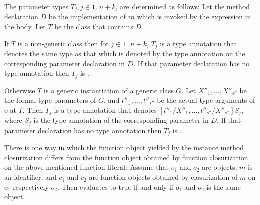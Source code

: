 \documentclass{article}
\begin{document}



\LMHash{}
The parameter types $T_j, j \in 1 .. n+k$, are determined as follows:
Let the method declaration $D$ be the implementation of $m$ which is invoked by the expression in the body.
Let $T$ be the class that contains $D$.


\LMHash{}
If $T$ is a non-generic class then for $j \in 1 .. n+k$,
$T_j$ is a type annotation that denotes the same type as that which is denoted by the type annotation on the corresponding parameter declaration in $D$.
If that parameter declaration has no type annotation then $T_j$ is \DYNAMIC{}.

\LMHash{}
Otherwise $T$ is a generic instantiation of a generic class $G$.
Let $X''_1, \ldots, X''_{s''}$ be the formal type parameters of $G$,
and $t''_1, \ldots, t''_{s''}$ be the actual type arguments of $o$ at $T$.
Then $T_j$ is a type annotation that denotes $[t''_1/X''_1, \ldots, t''_{s''}/X''_{s''}]S_j$,
where $S_j$ is the type annotation of the corresponding parameter in $D$.
If that parameter declaration has no type annotation then $T_j$ is \DYNAMIC{}.

\LMHash{}
There is one way in which
the function object yielded by the instance method closurization differs from
the function object obtained by function closurization on the above mentioned function literal:
Assume that $o_1$ and $o_2$ are objects, $m$ is an identifier,
and $c_1$ and $c_2$ are function objects
obtained by closurization of $m$ on $o_1$ respectively $o_2$.
Then  evaluates to true if and only if $o_1$ and $o_2$ is the same object.

\end{document}
